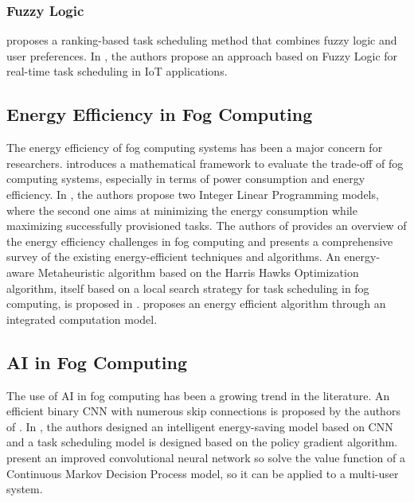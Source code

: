 \subsubsection*{Fuzzy Logic}
\label{subsubsec:fuzzy-logic}

\cite{benblidia-et-al-2019} proposes a ranking-based task scheduling method that combines fuzzy logic and user
preferences. In \cite{ali-et-al-2021}, the authors propose an approach based on Fuzzy Logic for real-time task
scheduling in IoT applications.

\subsection{Energy Efficiency in Fog Computing}
\label{subsec:energy-efficiency}

The energy efficiency of fog computing systems has been a major concern for researchers. \cite{alhumaima-2020}
introduces a mathematical framework to evaluate the trade-off of fog computing systems, especially in terms of power
consumption and energy efficiency. In \cite{he-et-al-2020}, the authors propose two Integer Linear Programming models,
where the second one aims at minimizing the energy consumption while maximizing successfully provisioned tasks. The
authors of \cite{malik-et-al-2022} provides an overview of the energy efficiency challenges in fog computing and
presents a comprehensive survey of the existing energy-efficient techniques and algorithms. An energy-aware
Metaheuristic algorithm based on the Harris Hawks Optimization algorithm, itself based on a local search strategy for
task scheduling in fog computing, is proposed in \cite{abdel-basset-et-al-2021}. \cite{wang-et-al-2023} proposes an
energy efficient algorithm through an integrated computation model.

\subsection{AI in Fog Computing}
\label{subsec:ai-in-fogcomputing}

The use of AI in fog computing has been a growing trend in the literature. An efficient binary CNN with numerous skip
connections is proposed by the authors of \cite{wu-et-al-2021}. In \cite{yang-et-al-2022}, the authors designed an
intelligent energy-saving model based on CNN and a task scheduling model is designed based on the policy gradient
algorithm. \cite{jing-xue-2023} present an improved convolutional neural network so solve the value function of a
Continuous Markov Decision Process model, so it can be applied to a multi-user system.
